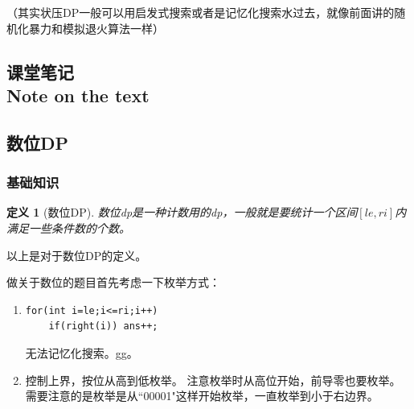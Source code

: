 \documentclass{article}
\newtheorem{definition}{定义}[subsection]
\theoremstyle{nonumberplain}
\newcommand{\note}{\ \par


	\subsection*{课堂笔记\\\tiny{Note on the text}}
	\newpage}
\begin{document}
	（其实状压DP一般可以用启发式搜索或者是记忆化搜索水过去，就像前面讲的随机化暴力和模拟退火算法一样）
	\note
	\subsection{数位DP}
	\subsubsection{基础知识}
	\begin{definition}[数位DP]数位dp是一种计数用的dp，一般就是要统计一个区间$[le,ri]$内满足一些条件数的个数。
	\end{definition}
	以上是对于数位DP的定义。

	做关于数位的题目首先考虑一下枚举方式：
	\begin{enumerate}
		\item{\begin{verbatim}
for(int i=le;i<=ri;i++)  
    if(right(i)) ans++;
\end{verbatim}
		      无法记忆化搜索。gg。}
		\item{控制上界，按位从高到低枚举。
		      注意枚举时从高位开始，前导零也要枚举。
		      需要注意的是枚举是从``00001"这样开始枚举，一直枚举到小于右边界。}
	\end{enumerate}
	
\end{document}
